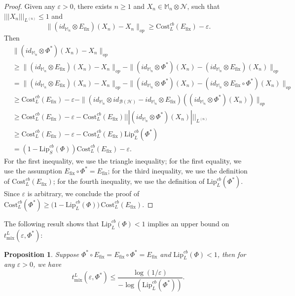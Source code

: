 \documentclass[11pt,reqno]{amsart}
\numberwithin{equation}{section}
\newtheorem{prop}[lemma]{Proposition}
\newcommand{\mb}{\mathbb}
\newcommand{\mc}{\mathcal}
\newcommand{\Lip}{\mathrm{Lip}}
\newcommand{\Cost}{\mathrm{Cost}}
\newcommand{\fix}{\mathrm{fix}}
\begin{document}
\begin{proof} 
Given any $\varepsilon > 0$, there exists $n \ge 1$ and $X_n \in \mb M_n \otimes \mc N$, such that $|||X_n|||_{L^{(n)}} \le 1$ and 
\begin{equation}
    \|(id_{\mb M_n}\otimes E_{\fix})(X_n) - X_n\|_{op} \ge \Cost_L^{cb}(E_\fix) - \varepsilon.
\end{equation}
Then 
\begin{align*}
    & \|(id_{\mb M_n}\otimes \Phi^*)(X_n) - X_n\|_{op} \\
    & \ge \|(id_{\mb M_n}\otimes E_{\fix})(X_n) - X_n\|_{op} - \|(id_{\mb M_n}\otimes \Phi^*)(X_n) - (id_{\mb M_n}\otimes E_{\fix})(X_n)\|_{op} \\
    & = \|(id_{\mb M_n}\otimes E_{\fix})(X_n) - X_n\|_{op} - \|(id_{\mb M_n}\otimes \Phi^*)(X_n) - (id_{\mb M_n}\otimes E_{\fix} \circ \Phi^*)(X_n)\|_{op} \\
    & \ge \Cost_L^{cb}(E_\fix) - \varepsilon - \|(id_{\mb M_n}\otimes id_{\mc B(\mc H)} - id_{\mb M_n}\otimes E_{\fix})\left((id_{\mb M_n}\otimes \Phi^*)(X_n) \right)\|_{op} \\
    & \ge \Cost_L^{cb}(E_\fix) - \varepsilon - \Cost_L^{cb}(E_\fix)|||(id_{\mb M_n}\otimes \Phi^*)(X_n)|||_{L^{(n)}} \\
    & \ge \Cost_L^{cb}(E_\fix) - \varepsilon - \Cost_L^{cb}(E_\fix) \Lip_L^{cb}(\Phi^*) \\
    & = (1-\Lip_S^{cb}(\Phi))\Cost_L^{cb}(E_\fix) - \varepsilon. 
\end{align*}
For the first inequality, we use the triangle inequality; for the first equality, we use the assumption $E_{\fix} \circ \Phi^*= E_{\fix}$; for the third inequality, we use the definition of $\Cost_L^{cb}(E_\fix)$; for the fourth inequality, we use the definition of $\Lip_L^{cb}(\Phi^*)$. Since $\varepsilon$ is arbitrary, we conclude the proof of $\Cost_L^{cb}(\Phi^*) \ge \bigl(1 - \Lip_L^{cb}(\Phi)\bigr)\, \Cost_L^{cb}(E_\fix)$.
\end{proof}
The following result shows that $\Lip_L^{cb}(\Phi) < 1$ implies an upper bound on $t_{\mathrm{mix}}^L(\varepsilon,\Phi^*)$:
\begin{prop}\label{prop:cost induced mixing time upper}
    Suppose $\Phi^* \circ E_{\fix} = E_{\fix} \circ \Phi^* = E_{\fix}$ and $\Lip_L^{cb}(\Phi) < 1$, then for any $\varepsilon > 0$, we have
    \begin{equation}
       t_{\mathrm{mix}}^L(\varepsilon,\Phi^*) \le \frac{\log (1/\varepsilon)}{ -\log (\Lip_L^{cb}(\Phi^*))}.
    \end{equation}
\end{prop}
\end{document}
